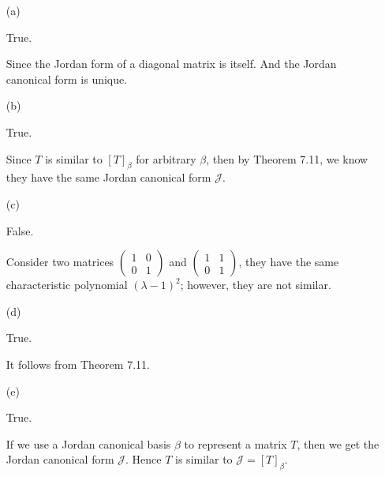 \begin{Exercise}
	\begin{enumerate}[(a)]
		\item[(a)]
		\begin{answer}
			True.
		\end{answer}
		\begin{solution}
			Since the Jordan form of a diagonal matrix is itself. And the Jordan canonical form is unique.
		\end{solution}
		
		\item[(b)]
		\begin{answer}
			True.
		\end{answer}
		\begin{solution}
			Since $T$ is similar to $[T]_{\beta}$ for arbitrary $\beta$, then by Theorem 7.11, we know they have the same Jordan canonical form $\mathcal{J}$.
		\end{solution}
		
		\item[(c)]
		\begin{answer}
			False.
		\end{answer}
		\begin{solution}
			Consider two matrices $\begin{pmatrix}
			1 & 0 \\
			0 & 1 
			\end{pmatrix}$ and $\begin{pmatrix}
			1 & 1 \\
			0 & 1
			\end{pmatrix}$, they have the same characteristic polynomial $(\lambda-1)^2$; however, they are not similar.
		\end{solution}
		
		\item[(d)]
		\begin{answer}
			True.
		\end{answer}
		\begin{solution}
			It follows from Theorem 7.11.
		\end{solution}
		
		\item[(e)]
		\begin{answer}
			True.
		\end{answer}
		\begin{solution}
			If we use a Jordan canonical basis $\beta$ to represent a matrix $T$, then we get the Jordan canonical form $\mathcal{J}$. Hence $T$ is similar to $\mathcal{J} = [T]_{\beta}$.
		\end{solution}
		

\end{enumerate}
\end{Exercise}
